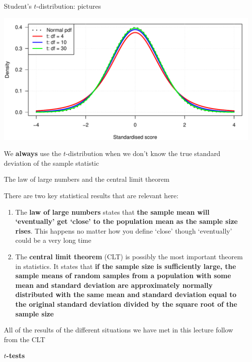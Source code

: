\documentclass[12pt,xcolor=dvipsnames,handout,mathserif,aspectratio=169]{beamer}
\newcommand{\bbl}[1]{{\color{NavyBlue} \textbf{#1}}}
\newcommand{\bre}[1]{{\color{red} \textbf{#1}}}
\newcommand{\bgr}[1]{{\color{PineGreen} \textbf{#1}}}
\begin{document}
\begin{frame}{Student's $t$-distribution: pictures}
\begin{center}
\includegraphics[width=\textwidth]{tdists.pdf}
\end{center}
We \bre{always} use the $t$-distribution when we don't know the true standard deviation of the sample statistic
\end{frame}

\begin{frame}{The law of large numbers and the central limit theorem}

There are two key statistical results that are relevant here:
\begin{enumerate}
\item The \bre{law of large numbers} states that \bgr{the sample mean will `eventually' get `close' to the population mean as the sample size rises}. This happens no matter how you define `close' though `eventually' could be a very long time
\pause
\item The \bre{central limit theorem} (CLT) is possibly the most important theorem in statistics. It states that \bgr{if the sample size is sufficiently large, the sample means of random samples from a population with some mean and standard deviation are approximately normally distributed with the same mean and standard deviation equal to the original standard deviation divided by the square root of the sample size}
\end{enumerate}
All of the results of the different situations we have met in this lecture follow from the CLT
\end{frame}

\begin{frame}[fragile]{}
\bbl{\Huge $t$-tests}\\ 
\vspace{0.5cm}
\end{frame}
\end{document}
